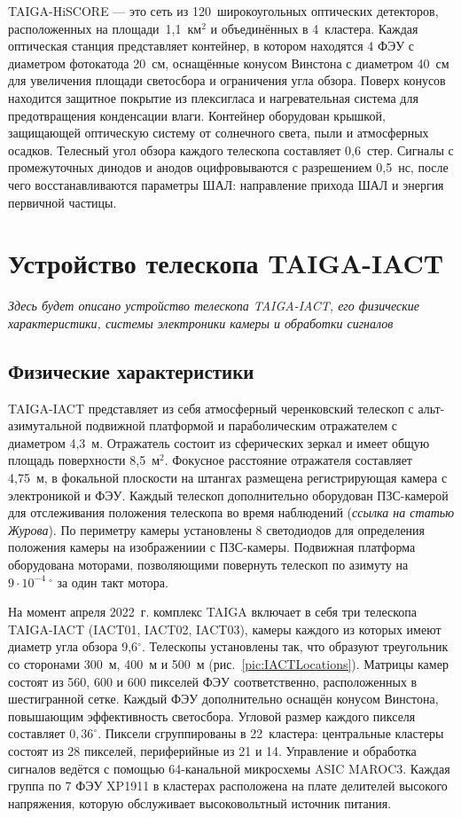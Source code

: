 \documentclass[magd,floatypics,numeref]{msudipl} %
\begin{document}
TAIGA-HiSCORE --- это сеть из 120~широкоугольных оптических детекторов, расположенных на площади~1{,}1~км$^\text{2}$ и объединённых в 4~кластера. Каждая оптическая станция представляет контейнер, в котором находятся 4 ФЭУ с диаметром фотокатода 20~см, оснащённые конусом Винстона с диаметром 40~см для увеличения площади светосбора и ограничения угла обзора. Поверх конусов находится защитное покрытие из плексигласа и нагревательная система для предотвращения конденсации влаги. Контейнер оборудован крышкой, защищающей оптическую систему от солнечного света, пыли и атмосферных осадков. Телесный угол обзора каждого телескопа составляет 0{,}6~стер. Сигналы с промежуточных динодов и анодов оцифровываются с разрешением 0{,}5~нс, после чего восстанавливаются параметры ШАЛ: направление прихода ШАЛ и энергия первичной частицы. 

\section{Устройство телескопа TAIGA-IACT}
\textit{
Здесь будет описано устройство телескопа TAIGA-IACT, его физические характеристики, системы электроники камеры и обработки сигналов
}
\subsection{Физические характеристики}
TAIGA-IACT представляет из себя атмосферный черенковский телескоп с альт-азимутальной подвижной платформой и параболическим отражателем с диаметром 4,3~м. Отражатель состоит из сферических зеркал и имеет общую площадь поверхности 8{,}5~$\text{м}^\text{2}$. Фокусное расстояние отражателя составляет 4{,}75~м, в фокальной плоскости на штангах размещена регистрирующая камера с электроникой и ФЭУ.  Каждый телескоп дополнительно оборудован ПЗС-камерой для отслеживания положения телескопа во время наблюдений (\textit{ссылка на статью Журова}). По периметру камеры установлены 8 светодиодов для определения положения камеры на изображениии с ПЗС-камеры. Подвижная платформа оборудована моторами, позволяющими повернуть телескоп по азимуту на $9\cdot10^{-4}~^{\circ}$ за один такт мотора. 

На момент апреля 2022~г. комплекс TAIGA включает в себя три телескопа TAIGA-IACT (IACT01, IACT02, IACT03), камеры каждого из которых имеют диаметр угла обзора 9{,}6$^{\circ}$. Телескопы установлены так, что образуют треугольник со сторонами 300~м, 400~м и 500~м (рис.~\ref{pic:IACTLocations}\afterpage{\clearpage}). Матрицы камер состоят из 560, 600 и 600 пикселей ФЭУ соответственно, расположенных в шестигранной сетке. Каждый ФЭУ дополнительно оснащён конусом Винстона, повышающим эффективность светосбора. Угловой размер каждого пикселя составляет $0,\!36^{\circ}$. Пиксели сгруппированы в 22~кластера: центральные кластеры состоят из 28 пикселей, периферийные из 21 и 14. Управление и обработка сигналов ведётся с помощью 64-канальной микросхемы ASIC MAROC3. Каждая группа по 7 ФЭУ XP1911 в кластерах расположена на плате делителей высокого напряжения, которую обслуживает высоковольтный источник питания. 
\end{document}
